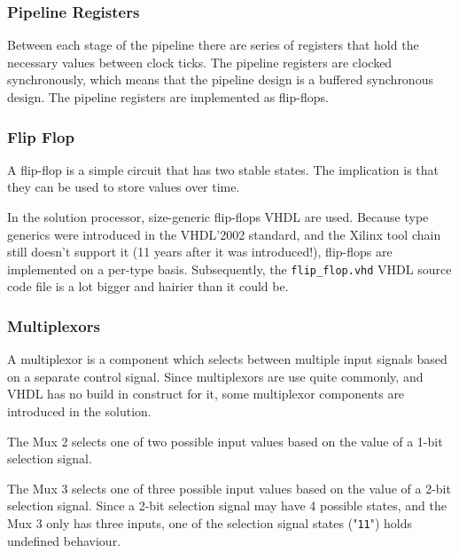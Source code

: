 \subsubsection{Pipeline Registers}

Between each stage of the pipeline there are series of registers that hold the necessary values between clock ticks.
The pipeline registers are clocked synchronously, which means that the pipeline design is a buffered synchronous design.
The pipeline registers are implemented as flip-flops.


\subsubsection{Flip Flop}

A flip-flop is a simple circuit that has two stable states.
The implication is that they can be used to store values over time.

In the solution processor, size-generic flip-flops VHDL are used.
Because type generics were introduced in the VHDL'2002 standard\cn, and the Xilinx tool chain still doesn't support it (11 years after it was introduced!), flip-flops are implemented on a per-type basis.
Subsequently, the \texttt{flip\_flop.vhd} VHDL source code file is a lot bigger and hairier than it could be.

\subsubsection{Multiplexors}

A multiplexor is a component which selects between multiple input signals based on a separate control signal.
Since multiplexors are use quite commonly, and VHDL has no build in construct for it, some multiplexor components are introduced in the solution.


The Mux 2 selects one of two possible input values based on the value of a 1-bit selection signal.


The Mux 3 selects one of three possible input values based on the value of a 2-bit selection signal.
Since a 2-bit selection signal may have 4 possible states, and the Mux 3 only has three inputs, one of the selection signal states ("\texttt{11}") holds undefined behaviour.
